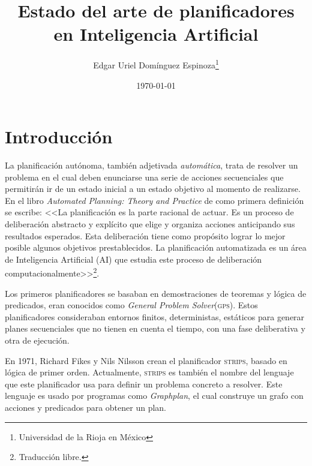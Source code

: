 \documentclass[a4paper,12pt,twocolumn]{article}
\title{Estado del arte de planificadores en Inteligencia Artificial}
\author{Edgar Uriel Domínguez Espinoza\thanks{Universidad de la Rioja en México}}
\date{\today}
\begin{document}
\maketitle


\section{Introducción}

La planificación autónoma, también adjetivada \emph{automática}, trata de resolver un problema en el cual deben enunciarse una serie de acciones secuenciales que permitirán ir de un estado inicial a un estado objetivo al momento de realizarse\citep{Tapia_García_2017}. En el libro \emph{Automated Planning: Theory and Practice} de \citet[cap. 1]{Ghallab_Nau_Traverso_2004} como primera definición se escribe: <<La planificación es la parte racional de actuar. Es un proceso de deliberación abstracto y explícito que elige y organiza acciones anticipando sus resultados esperados. Esta deliberación tiene como propósito lograr lo mejor posible algunos objetivos prestablecidos. La planificación automatizada es un área de Inteligencia Artificial (AI) que estudia este proceso de deliberación computacionalmente>>\footnote{Traducción libre.}.

Los primeros planificadores se basaban en demostraciones de teoremas y lógica de predicados, eran conocidos como \emph{General Problem Solver}(\textsc{gps}). Estos planificadores consideraban entornos finitos, deterministas, estáticos para generar planes secuenciales que no tienen en cuenta el tiempo, con una fase deliberativa y otra de ejecución.\citep{Tapia_García_2017}

En 1971, Richard Fikes y Nils Nilsson crean el planificador \textsc{strips}, basado en lógica de primer orden. Actualmente, \textsc{strips} es también el nombre del lenguaje que este planificador usa para definir un problema concreto a resolver. Este lenguaje es usado por programas como \emph{Graphplan}, el cual construye un grafo con acciones y predicados para obtener un plan.\citep{Tapia_García_2017}
\end{document}
